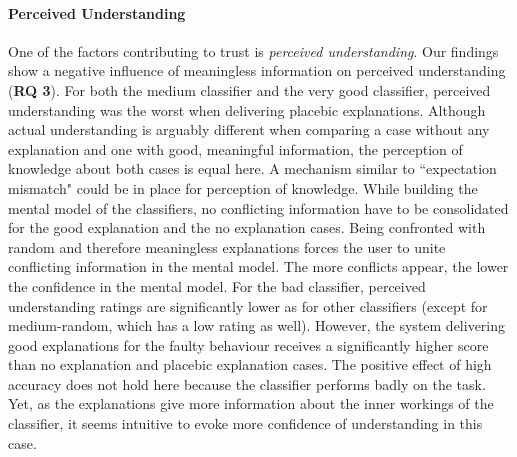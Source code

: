 \paragraph{Perceived Understanding} 
One of the factors contributing to trust is \textit{perceived understanding}. Our findings show a negative influence of meaningless information on perceived understanding (\textbf{RQ 3}). For both the medium classifier and the very good classifier, perceived understanding was the worst when delivering placebic explanations. Although actual understanding is arguably different when comparing a case without any explanation and one with good, meaningful information, the perception of knowledge about both cases is equal here. A mechanism similar to ``expectation mismatch" could be in place for perception of knowledge. While building the mental model of the classifiers, no conflicting information have to be consolidated for the good explanation and the no explanation cases. Being confronted with random and therefore meaningless explanations forces the user to unite conflicting information in the mental model. The more conflicts appear, the lower the confidence in the mental model.\newline
For the bad classifier, perceived understanding ratings are significantly lower as for other classifiers (except for medium-random, which has a low rating as well). However, the system delivering good explanations for the faulty behaviour receives a significantly higher score than no explanation and placebic explanation cases. The positive effect of high accuracy does not hold here because the classifier performs badly on the task. Yet, as the explanations give more information about the inner workings of the classifier, it seems intuitive to evoke more confidence of understanding in this case.\newline

